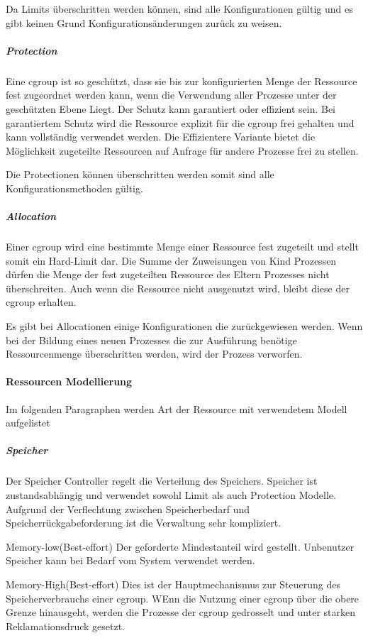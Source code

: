 Da Limits überschritten werden können, sind alle Konfigurationen gültig und es gibt keinen Grund Konfigurationsänderungen zurück zu weisen.

\subparagraph{Protection}
Eine cgroup ist so geschützt, dass sie bis zur konfigurierten Menge der Ressource fest zugeordnet werden kann, wenn die Verwendung aller Prozesse unter der geschützten Ebene Liegt. Der Schutz kann garantiert oder effizient sein. Bei garantiertem Schutz wird die Ressource explizit für die cgroup frei gehalten und kann vollständig verwendet werden. Die Effizientere Variante bietet die Möglichkeit zugeteilte Ressourcen auf Anfrage für andere Prozesse frei zu stellen.

Die Protectionen können überschritten werden somit sind alle Konfigurationsmethoden gültig.

\subparagraph{Allocation}
Einer cgroup wird eine bestimmte Menge einer Ressource fest zugeteilt und stellt somit ein Hard-Limit dar. Die Summe der Zuweisungen von Kind Prozessen dürfen die Menge der fest zugeteilten Ressource des Eltern Prozesses nicht überschreiten. Auch wenn die Ressource nicht ausgenutzt wird, bleibt diese der cgroup erhalten. 

Es gibt bei Allocationen einige Konfigurationen die zurückgewiesen werden. Wenn bei der Bildung eines neuen Prozesses die zur Ausführung benötige Ressourcenmenge überschritten werden, wird der Prozess verworfen.

\paragraph{Ressourcen Modellierung}
Im folgenden Paragraphen werden Art der Ressource mit verwendetem Modell aufgelistet

\subparagraph{Speicher}
Der Speicher Controller regelt die Verteilung des Speichers. Speicher ist zustandsabhängig und verwendet sowohl Limit als auch Protection Modelle. Aufgrund der Verflechtung zwischen Speicherbedarf und Speicherrückgabeforderung ist die Verwaltung sehr kompliziert.

Memory-low(Best-effort)
Der geforderte Mindestanteil wird gestellt. Unbenutzer Speicher kann bei Bedarf vom System verwendet werden.

Memory-High(Best-effort)
Dies ist der Hauptmechanismus zur Steuerung des Speicherverbrauchs einer cgroup. WEnn die Nutzung einer cgroup über die obere Grenze hinausgeht, werden die Prozesse der cgroup gedrosselt und unter starken Reklamationsdruck gesetzt.

